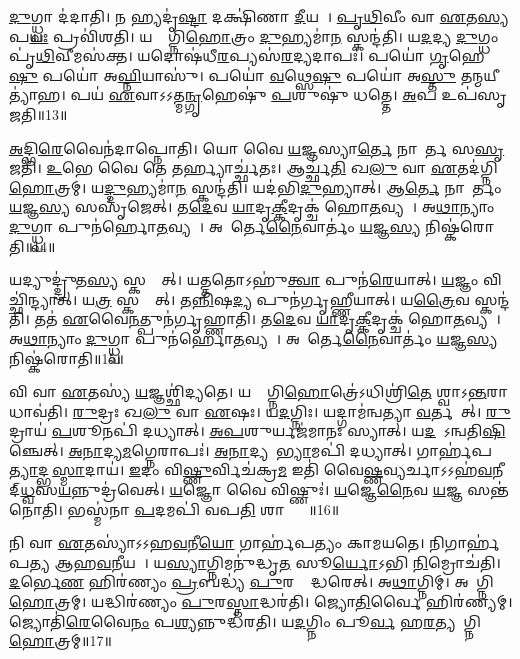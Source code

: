 \ul{𑌦𑍁}𑌗𑍍𑌧𑍍𑌵𑌾 𑌦॑𑌦𑌾𑌤𑌿।
𑌨 𑌹𑍍𑌯𑌦𑍃॑\ul{𑌷𑍍𑌟𑌾} 𑌦𑌕𑍍𑌷𑌿॑𑌣𑌾 \ul{𑌦𑍀}𑌯𑌤𑍇᳚।
\ul{𑌪𑍃}\ul{𑌥𑌿}𑌵𑍀𑌂 𑌵𑌾 \ul{𑌏}𑌤\ul{𑌸𑍍𑌯} 𑌪\ul{𑌯𑌃} 𑌪𑍍𑌰𑌵𑌿॑𑌶𑌤𑌿।
𑌯𑌸𑍍𑌯𑌾᳚𑌗𑍍𑌨𑌿\ul{𑌹𑍋}𑌤𑍍𑌰𑌂 \ul{𑌦𑍁}𑌹𑍍𑌯𑌮𑌾॑\ul{𑌨}\ul{} 𑌸𑍍𑌕𑌨𑍍𑌦॑𑌤𑌿।
𑌯\ul{𑌦}𑌦𑍍𑌯 \ul{𑌦𑍁}𑌗𑍍𑌧𑌂 𑌪𑍃॑\ul{𑌥𑌿}𑌵𑍀𑌮𑌸॑𑌕𑍍𑌤।
𑌯𑌦𑍋𑌷॑𑌧𑍀\ul{𑌰}𑌪𑍍𑌯𑌸॑\ul{𑌰}𑌦𑍍𑌯𑌦𑌾𑌪𑌃॑।
𑌪𑌯𑍋॑ \ul{𑌗𑍃}𑌹𑍇\ul{𑌷𑍁} 𑌪𑌯𑍋॑ 𑌅\ul{𑌘𑍍𑌨𑌿}𑌯𑌾𑌸𑍁॑।
𑌪𑌯𑍋॑ \ul{𑌵}𑌥𑍍𑌸𑍇\ul{𑌷𑍁} 𑌪𑌯𑍋॑ 𑌅\ul{𑌸𑍍𑌤𑍁} 𑌤𑌨𑍍𑌮𑌯𑍀𑌤𑍍𑌯𑌾॑𑌹।
𑌪𑌯॑ \ul{𑌏}𑌵𑌾𑌽𑌽𑌤𑍍𑌮\ul{𑌨𑍍𑌗𑍃}𑌹𑍇𑌷𑍁॑ \ul{𑌪}𑌶𑍁𑌷𑍁॑ 𑌧𑌤𑍍𑌤𑍇।
\ul{𑌅}𑌪 𑌉𑌪॑𑌸𑍃𑌜𑌤𑌿॥13॥

\ul{𑌅}𑌦𑍍𑌭𑌿\ul{𑌰𑍇}𑌵𑍈𑌨॑𑌦𑌾𑌪𑍍𑌨𑍋𑌤𑌿।
𑌯𑍋 𑌵𑍈 \ul{𑌯}𑌜𑍍𑌞𑌸𑍍𑌯𑌾\ul{𑌰𑍍𑌤𑍇} 𑌨𑌾𑌨𑌾᳚𑌰𑍍𑌤 𑌸\ul{𑌸𑍃}𑌜𑌤𑌿॑।
\ul{𑌉}𑌭𑍇 𑌵𑍈 𑌤𑍇 𑌤𑌰𑍍𑌹𑍍𑌯𑌾𑌰𑍍𑌚𑍍𑌛॑𑌤𑌃।
𑌆𑌰𑍍𑌚𑍍𑌛॑\ul{𑌤𑌿} 𑌖\ul{𑌲𑍁} 𑌵𑌾 \ul{𑌏}𑌤𑌦॑𑌗𑍍𑌨𑌿\ul{𑌹𑍋}𑌤𑍍𑌰𑌮𑍍।
𑌯\ul{𑌦𑍍𑌦𑍁}𑌹𑍍𑌯𑌮𑌾॑\ul{𑌨}\ul{} 𑌸𑍍𑌕𑌨𑍍𑌦॑𑌤𑌿।
𑌯𑌦॑𑌭𑌿\ul{𑌦𑍁}𑌹𑍍𑌯𑌾𑌤𑍍।
𑌆\ul{𑌰𑍍𑌤𑍇} 𑌨𑌾𑌨𑌾᳚𑌰𑍍𑌤𑌂 \ul{𑌯}𑌜𑍍𑌞\ul{𑌸𑍍𑌯} 𑌸𑌸𑍃॑𑌜𑍇𑌤𑍍।
𑌤\ul{𑌦𑍇}𑌵 \ul{𑌯𑌾}𑌦𑍃\ul{𑌕𑍍𑌕𑍀}𑌦𑍃𑌕𑍍𑌚॑ 𑌹𑍋\ul{𑌤}𑌵𑍍𑌯𑌮𑍍᳚।
𑌅\ul{𑌥𑌾}𑌨𑍍𑌯𑌾𑌂 \ul{𑌦𑍁}𑌗𑍍𑌧𑍍𑌵𑌾 𑌪𑍁𑌨॑𑌰𑍍\mbox{}𑌹𑍋\ul{𑌤}𑌵𑍍𑌯𑌮𑍍᳚।
𑌅𑌨𑌾᳚𑌰𑍍𑌤𑍇\ul{𑌨𑍈}𑌵𑌾𑌰𑍍𑌤𑌂॑ \ul{𑌯}𑌜𑍍𑌞\ul{𑌸𑍍𑌯} 𑌨𑌿𑌷𑍍𑌕॑𑌰𑍋𑌤𑌿॥14॥

𑌯𑌦𑍍𑌯𑍁𑌦𑍍𑌦𑍍𑌰𑍁॑𑌤\ul{𑌸𑍍𑌯} 𑌸𑍍𑌕𑌨𑍍𑌦𑍇᳚𑌤𑍍।
𑌯𑌤𑍍𑌤𑌤𑍋\-𑌽𑌹𑍁॑\ul{𑌤𑍍𑌵𑌾} 𑌪𑍁𑌨॑\ul{𑌰𑍇}𑌯𑌾𑌤𑍍।
\ul{𑌯}𑌜𑍍𑌞𑌂 𑌵𑌿𑌚𑍍𑌛𑌿॑𑌨𑍍𑌦𑍍𑌯𑌾𑌤𑍍।
𑌯\ul{𑌤𑍍𑌰} 𑌸𑍍𑌕𑌨𑍍𑌦𑍇᳚𑌤𑍍।
𑌤\ul{𑌨𑍍𑌨𑌿}𑌷\ul{𑌦𑍍𑌯} 𑌪𑍁𑌨॑𑌰𑍍𑌗𑍃𑌹𑍍𑌣𑍀𑌯𑌾𑌤𑍍।
𑌯\ul{𑌤𑍍𑌰𑍈}𑌵 𑌸𑍍𑌕𑌨𑍍𑌦॑𑌤𑌿।
𑌤𑌤॑ \ul{𑌏}𑌵𑍈\ul{𑌨}𑌤𑍍𑌪𑍁𑌨॑𑌰𑍍𑌗𑍃𑌹𑍍𑌣𑌾𑌤𑌿।
𑌤\ul{𑌦𑍇}𑌵 \ul{𑌯𑌾}𑌦𑍃\ul{𑌕𑍍𑌕𑍀}𑌦𑍃𑌕𑍍𑌚॑ 𑌹𑍋\ul{𑌤}𑌵𑍍𑌯𑌮𑍍᳚।
𑌅\ul{𑌥𑌾}𑌨𑍍𑌯𑌾𑌂 \ul{𑌦𑍁}𑌗𑍍𑌧𑍍𑌵𑌾 𑌪𑍁𑌨॑𑌰𑍍\mbox{}𑌹𑍋\ul{𑌤}𑌵𑍍𑌯𑌮𑍍᳚।
𑌅𑌨𑌾᳚𑌰𑍍𑌤𑍇\ul{𑌨𑍈}𑌵𑌾𑌰𑍍𑌤𑌂॑ \ul{𑌯}𑌜𑍍𑌞\ul{𑌸𑍍𑌯} 𑌨𑌿𑌷𑍍𑌕॑𑌰𑍋𑌤𑌿॥15॥

𑌵𑌿 𑌵𑌾 \ul{𑌏}𑌤𑌸𑍍𑌯॑ \ul{𑌯}𑌜𑍍𑌞𑌶𑍍𑌛𑌿॑𑌦𑍍𑌯𑌤𑍇।
𑌯𑌸𑍍𑌯𑌾᳚𑌗𑍍𑌨𑌿\ul{𑌹𑍋}𑌤𑍍𑌰𑍇॑\-𑌽𑌧𑌿𑌶𑍍𑌰𑌿॑\ul{𑌤𑍇} 𑌶𑍍𑌵𑌾\-𑌽\ul{𑌨𑍍𑌤}𑌰𑌾 𑌧𑌾𑌵॑𑌤𑌿।
\ul{𑌰𑍁}𑌦𑍍𑌰𑌃 𑌖\ul{𑌲𑍁} 𑌵𑌾 \ul{𑌏}𑌷𑌃।
𑌯\ul{𑌦}𑌗𑍍𑌨𑌿𑌃।
𑌯𑌦𑍍𑌗𑌾𑌮॑𑌨𑍍𑌵𑌤𑍍𑌯𑌾 \ul{𑌵}𑌰𑍍𑌤𑌯𑍇᳚𑌤𑍍।
\ul{𑌰𑍁}𑌦𑍍𑌰𑌾𑌯॑ \ul{𑌪}𑌶𑍂𑌨𑌪𑌿॑ 𑌦𑌧𑍍𑌯𑌾𑌤𑍍।
\ul{𑌅}\ul{𑌪}𑌶𑍁𑌰𑍍𑌯𑌜॑𑌮𑌾𑌨𑌃 𑌸𑍍𑌯𑌾𑌤𑍍।
𑌯\ul{𑌦}𑌪𑍋᳚\-𑌽𑌨𑍍𑌵𑌤𑌿\ul{𑌷𑌿}𑌞𑍍𑌚𑍇𑌤𑍍।
\ul{𑌅}\ul{𑌨𑌾}𑌦𑍍𑌯\ul{𑌮}𑌗𑍍𑌨𑍇𑌰𑌾𑌪𑌃॑।
\ul{𑌅}\ul{𑌨𑌾}𑌦𑍍𑌯𑌮𑌾᳚\ul{𑌭𑍍𑌯𑌾}𑌮𑌪𑌿॑ 𑌦𑌧𑍍𑌯𑌾𑌤𑍍।
𑌗𑌾𑌰𑍍\mbox{}𑌹॑𑌪\ul{𑌤𑍍𑌯𑌾}𑌦𑍍𑌭\ul{𑌸𑍍𑌮𑌾}𑌦𑌾𑌯॑।
\ul{𑌇}𑌦𑌂 𑌵𑌿\ul{𑌷𑍍𑌣𑍁}𑌰𑍍𑌵𑌿𑌚॑𑌕𑍍𑌰\ul{𑌮} 𑌇𑌤𑌿॑ 𑌵𑍈\ul{𑌷𑍍𑌣}𑌵𑍍𑌯𑌰𑍍𑌚𑌾\-𑌽𑌽𑌹॑\ul{𑌵}𑌨𑍀𑌯𑌾᳚𑌦𑍍‌\ul{𑌧𑍍𑌵}\ul{}𑌸\ul{𑌯}𑌨𑍍𑌨𑍁𑌦𑍍𑌰॑𑌵𑍇𑌤𑍍।
\ul{𑌯}𑌜𑍍𑌞𑍋 𑌵𑍈 𑌵𑌿𑌷𑍍𑌣𑍁𑌃॑।
\ul{𑌯}𑌜𑍍𑌞𑍇\ul{𑌨𑍈}𑌵 \ul{𑌯}𑌜𑍍𑌞 𑌸𑌨𑍍𑌤॑𑌨𑍋𑌤𑌿।
𑌭𑌸𑍍𑌮॑𑌨𑌾 \ul{𑌪}𑌦𑌮𑌪𑌿॑ 𑌵𑌪\ul{𑌤𑌿} 𑌶𑌾𑌨𑍍𑌤𑍍𑌯𑍈᳚॥16॥\anuvakamend[𑌵𑍈 \ul{𑌦𑍇}𑌵𑍍𑌯𑌦𑌿॑𑌤𑌿𑌰𑍍𑌮𑍁𑌞𑍍𑌚𑌤𑌿 𑌸𑍃𑌜𑌤𑌿 𑌕𑌰𑍋𑌤𑌿 𑌕𑌰𑍋𑌤𑍍𑌯𑌾\ul{𑌭𑍍𑌯𑌾}𑌮𑌪𑌿॑ 𑌦\ul{𑌧𑍍𑌯𑌾}𑌤𑍍 𑌪𑌞𑍍𑌚॑ 𑌚]

𑌨𑌿 𑌵𑌾 \ul{𑌏}𑌤𑌸𑍍𑌯𑌾॑\-𑌽𑌽𑌹\ul{𑌵}𑌨𑍀\ul{𑌯𑍋} 𑌗𑌾𑌰𑍍\mbox{}𑌹॑𑌪𑌤𑍍𑌯𑌂 𑌕𑌾𑌮𑌯𑌤𑍇।
𑌨𑌿𑌗𑌾𑌰𑍍\mbox{}𑌹॑𑌪𑌤𑍍𑌯 𑌆𑌹\ul{𑌵}𑌨𑍀𑌯𑌮𑍍᳚।
𑌯\ul{𑌸𑍍𑌯𑌾}𑌗𑍍𑌨𑌿𑌮𑌨𑍁॑𑌦𑍍𑌧𑍃\ul{𑌤}\ul{} 𑌸𑍂\ul{𑌰𑍍𑌯𑍋}𑌽𑌭𑌿 \ul{𑌨𑌿}𑌮𑍍𑌰𑍋𑌚॑𑌤𑌿।
\ul{𑌦}𑌰𑍍𑌭𑍇\ul{𑌣} 𑌹𑌿𑌰॑𑌣𑍍𑌯𑌂 \ul{𑌪𑍍𑌰}𑌬𑌦𑍍𑌧𑍍𑌯॑ \ul{𑌪𑍁}𑌰𑌸𑍍𑌤𑌾᳚𑌦𑍍𑌧𑌰𑍇𑌤𑍍।
𑌅\ul{𑌥𑌾}𑌗𑍍𑌨𑌿𑌮𑍍।
𑌅𑌥𑌾᳚𑌗𑍍𑌨𑌿\ul{𑌹𑍋}𑌤𑍍𑌰𑌮𑍍।
𑌯𑌦𑍍𑌧𑌿𑌰॑𑌣𑍍𑌯𑌂 \ul{𑌪𑍁}𑌰\ul{𑌸𑍍𑌤𑌾}𑌦𑍍𑌧𑌰॑𑌤𑌿।
𑌜𑍍𑌯𑍋\ul{𑌤𑌿}𑌰𑍍𑌵𑍈 𑌹𑌿𑌰॑𑌣𑍍𑌯𑌮𑍍।
𑌜𑍍𑌯𑍋𑌤𑌿॑\ul{𑌰𑍇}𑌵𑍈\ul{𑌨𑌂} 𑌪\ul{𑌶𑍍𑌯}𑌨𑍍𑌨𑍁𑌦𑍍𑌧॑𑌰𑌤𑌿।
𑌯\ul{𑌦}𑌗𑍍𑌨𑌿𑌂 𑌪𑍂\ul{𑌰𑍍𑌵}\ul{} 𑌹\ul{𑌰}𑌤𑍍𑌯𑌥𑌾᳚𑌗𑍍𑌨𑌿\ul{𑌹𑍋}𑌤𑍍𑌰𑌮𑍍॥17॥


